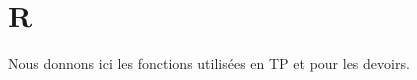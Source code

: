 \section{R}
    Nous donnons ici les fonctions utilisées en TP et pour les devoirs.

    
    
    
    